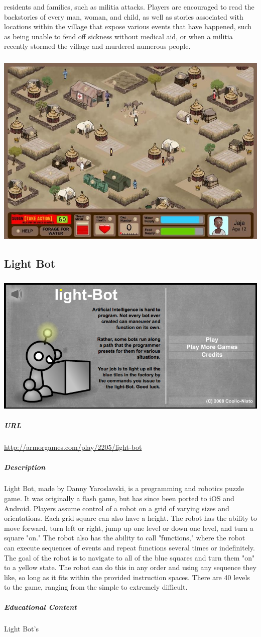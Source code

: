 residents and families, such as militia attacks. Players are encouraged to read the backstories of every man, woman, and child, as well as stories associated with locations within the village that expose various events that have happened, such as being unable to fend off sickness without medical aid, or when a militia recently stormed the village and murdered numerous people.\subparagraph{}\includegraphics[width = \textwidth]{img/darfur_screen1.jpg}\subsection{Light Bot}\subparagraph{}\includegraphics[width = \textwidth]{img/lightbot_title.png}\subparagraph{URL}\url{http://armorgames.com/play/2205/light-bot}\subparagraph{Description}Light Bot, made by Danny Yaroslavski, is a programming and robotics puzzle game. It was originally a flash game, but has since been ported to iOS and Android. Players assume control of a robot on a grid of varying sizes and orientations. Each grid square can also have a height. The robot has the ability to move forward, turn left or right, jump up one level or down one level, and turn a square "on." The robot also has the ability to call "functions," where the robot can execute sequences of events and repeat functions several times or indefinitely. The goal of the robot is to navigate to all of the blue squares and turn them "on" to a yellow state. The robot can do this in any order and using any sequence they like, so long as it fits within the provided instruction spaces. There are 40 levels to the game, ranging from the simple to extremely difficult.\subparagraph{Educational Content}Light Bot's 